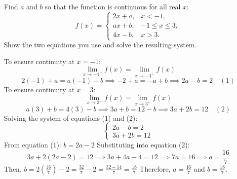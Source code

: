 \begin{questions}

\question[4] Find \(a\) and \(b\) so that the function is continuous for all real \(x\):
\[
f(x)=
\begin{cases}
2x+a, & x<-1,\\
ax+b, & -1\leq x\leq3,\\
4x-b, & x>3.
\end{cases}
\]
Show the two equations you use and solve the resulting system.
\begin{solution}[5cm]
  To ensure continuity at \(x=-1\):
  \[
  \lim_{x \to -1^-} f(x) = \lim_{x \to -1^+} f(x)
  \]
  \[
  2(-1) + a = a(-1) + b \implies -2 + a = -a + b \implies 2a - b = 2 \quad (1)
  \] 
  To ensure continuity at \(x=3\):
  \[
  \lim_{x \to 3^-} f(x) = \lim_{x \to 3^+} f(x)
  \]
  \[
  a(3) + b = 4(3) - b \implies 3a + b = 12 - b \implies 3a + 2b = 12 \quad (2)
  \]
  Solving the system of equations (1) and (2):
  \[
  \begin{cases}
  2a - b = 2 \\
  3a + 2b = 12
  \end{cases}
  \]
  From equation (1): \(b = 2a - 2\)
  Substituting into equation (2):
  \[
  3a + 2(2a - 2) = 12 \implies 3a + 4a - 4 = 12 \implies 7a = 16 \implies a = \frac{16}{7}
  \]
  Then, \(b = 2(\frac{16}{7}) - 2 = \frac{32}{7} - 2 = \frac{32 - 14}{7} = \frac{18}{7}\)
  Therefore, \(a = \frac{16}{7}\) and \(b = \frac{18}{7}\).
\end{solution}


\end{questions}
